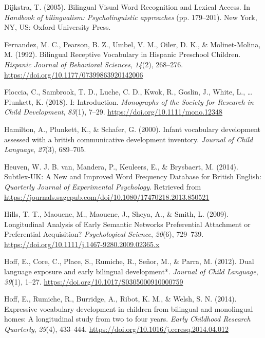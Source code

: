 \documentclass[
  english,
  man,man,floatsintext]{apa6}
\newlength{\cslhangindent}
\newenvironment{cslreferences}%
  {\setlength{\parindent}{0pt}%
  \everypar{\setlength{\hangindent}{\cslhangindent}}\ignorespaces}%
  {\par}
\begin{document}
\begin{cslreferences}
\leavevmode\hypertarget{ref-dijkstra_bilingual_2005}{}%
Dijkstra, T. (2005). Bilingual Visual Word Recognition and Lexical Access. In \emph{Handbook of bilingualism: Psycholinguistic approaches} (pp. 179--201). New York, NY, US: Oxford University Press.

\leavevmode\hypertarget{ref-fernandez_bilingual_1992}{}%
Fernandez, M. C., Pearson, B. Z., Umbel, V. M., Oiler, D. K., \& Molinet-Molina, M. (1992). Bilingual Receptive Vocabulary in Hispanic Preschool Children. \emph{Hispanic Journal of Behavioral Sciences}, \emph{14}(2), 268--276. \url{https://doi.org/10.1177/07399863920142006}

\leavevmode\hypertarget{ref-floccia_i_2018}{}%
Floccia, C., Sambrook, T. D., Luche, C. D., Kwok, R., Goslin, J., White, L., \ldots{} Plunkett, K. (2018). I: Introduction. \emph{Monographs of the Society for Research in Child Development}, \emph{83}(1), 7--29. \url{https://doi.org/10.1111/mono.12348}

\leavevmode\hypertarget{ref-hamilton_infant_2000}{}%
Hamilton, A., Plunkett, K., \& Schafer, G. (2000). Infant vocabulary development assessed with a british communicative development inventory. \emph{Journal of Child Language}, \emph{27}(3), 689--705.

\leavevmode\hypertarget{ref-heuven_subtlex-uk_2014}{}%
Heuven, W. J. B. van, Mandera, P., Keuleers, E., \& Brysbaert, M. (2014). Subtlex-UK: A New and Improved Word Frequency Database for British English: \emph{Quarterly Journal of Experimental Psychology}. Retrieved from \url{https://journals.sagepub.com/doi/10.1080/17470218.2013.850521}

\leavevmode\hypertarget{ref-hills_longitudinal_2009}{}%
Hills, T. T., Maouene, M., Maouene, J., Sheya, A., \& Smith, L. (2009). Longitudinal Analysis of Early Semantic Networks Preferential Attachment or Preferential Acquisition? \emph{Psychological Science}, \emph{20}(6), 729--739. \url{https://doi.org/10.1111/j.1467-9280.2009.02365.x}

\leavevmode\hypertarget{ref-hoff_dual_2012}{}%
Hoff, E., Core, C., Place, S., Rumiche, R., Señor, M., \& Parra, M. (2012). Dual language exposure and early bilingual development*. \emph{Journal of Child Language}, \emph{39}(1), 1--27. \url{https://doi.org/10.1017/S0305000910000759}

\leavevmode\hypertarget{ref-hoff_expressive_2014}{}%
Hoff, E., Rumiche, R., Burridge, A., Ribot, K. M., \& Welsh, S. N. (2014). Expressive vocabulary development in children from bilingual and monolingual homes: A longitudinal study from two to four years. \emph{Early Childhood Research Quarterly}, \emph{29}(4), 433--444. \url{https://doi.org/10.1016/j.ecresq.2014.04.012}


\end{cslreferences}
\end{document}
